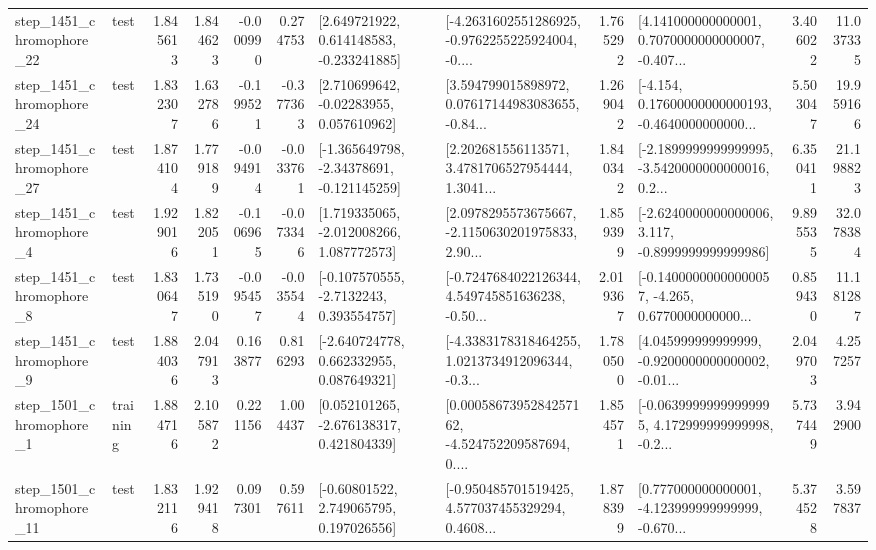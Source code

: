 \begin{tabular}{llrrrrllrlrr}
 step\_1451\_chromophore\_22 &      test &      1.845613 &    1.844623 &     -0.000990 &  0.274753 &    [2.649721922, 0.614148583, -0.233241885] &  [-4.2631602551286925, -0.9762255225924004, -0.... &       1.765292 &  [4.141000000000001, 0.7070000000000007, -0.407... &            3.406022 &         11.037335 \\
 step\_1451\_chromophore\_24 &      test &      1.832307 &    1.632786 &     -0.199521 & -0.377363 &     [2.710699642, -0.02283955, 0.057610962] &  [3.594799015898972, 0.07617144983083655, -0.84... &       1.269042 &  [-4.154, 0.17600000000000193, -0.4640000000000... &            5.503047 &         19.959166 \\
 step\_1451\_chromophore\_27 &      test &      1.874104 &    1.779189 &     -0.094914 & -0.033761 &   [-1.365649798, -2.34378691, -0.121145259] &  [2.202681556113571, 3.4781706527954444, 1.3041... &       1.840342 &  [-2.1899999999999995, -3.5420000000000016, 0.2... &            6.350411 &         21.198823 \\
  step\_1451\_chromophore\_4 &      test &      1.929016 &    1.822051 &     -0.106965 & -0.073346 &    [1.719335065, -2.012008266, 1.087772573] &  [2.0978295573675667, -2.1150630201975833, 2.90... &       1.859399 &  [-2.6240000000000006, 3.117, -0.8999999999999986] &            9.895535 &         32.078384 \\
  step\_1451\_chromophore\_8 &      test &      1.830647 &    1.735190 &     -0.095457 & -0.035544 &     [-0.107570555, -2.7132243, 0.393554757] &  [-0.7247684022126344, 4.549745851636238, -0.50... &       2.019367 &  [-0.14000000000000057, -4.265, 0.6770000000000... &            0.859430 &         11.181287 \\
  step\_1451\_chromophore\_9 &      test &      1.884036 &    2.047913 &      0.163877 &  0.816293 &    [-2.640724778, 0.662332955, 0.087649321] &  [-4.3383178318464255, 1.0213734912096344, -0.3... &       1.780500 &  [4.045999999999999, -0.9200000000000002, -0.01... &            2.049703 &          4.257257 \\
  step\_1501\_chromophore\_1 &  training &      1.884716 &    2.105872 &      0.221156 &  1.004437 &    [0.052101265, -2.676138317, 0.421804339] &  [0.0005867395284257162, -4.524752209587694, 0.... &       1.854571 &  [-0.06399999999999995, 4.172999999999998, -0.2... &            5.737449 &          3.942900 \\
 step\_1501\_chromophore\_11 &      test &      1.832116 &    1.929418 &      0.097301 &  0.597611 &     [-0.60801522, 2.749065795, 0.197026556] &  [-0.950485701519425, 4.577037455329294, 0.4608... &       1.878399 &  [0.777000000000001, -4.123999999999999, -0.670... &            5.374528 &          3.597837 \\

\end{tabular}

